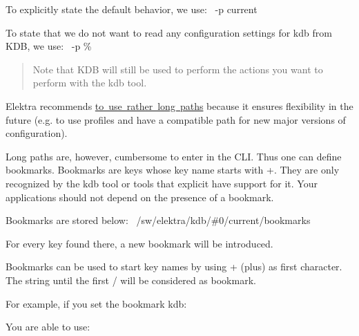 To explicitly state the default behavior, we use\+:~\newline
 {\ttfamily -\/p current}

To state that we do not want to read any configuration settings for {\ttfamily kdb} from K\+DB, we use\+:~\newline
 {\ttfamily -\/p \%}

\begin{quote}
Note that K\+DB will still be used to perform the actions you want to perform with the {\ttfamily kdb} tool. \end{quote}


Elektra recommends \mbox{\hyperlink{doc_tutorials_application-integration_md}{to use rather long paths}} because it ensures flexibility in the future (e.\+g. to use profiles and have a compatible path for new major versions of configuration).

Long paths are, however, cumbersome to enter in the C\+LI. Thus one can define bookmarks. Bookmarks are keys whose key name starts with {\ttfamily +}. They are only recognized by the {\ttfamily kdb} tool or tools that explicit have support for it. Your applications should not depend on the presence of a bookmark.

Bookmarks are stored below\+:~\newline
 {\ttfamily /sw/elektra/kdb/\#0/current/bookmarks}

For every key found there, a new bookmark will be introduced.

Bookmarks can be used to start key names by using {\ttfamily +} (plus) as first character. The string until the first {\ttfamily /} will be considered as bookmark.

For example, if you set the bookmark kdb\+:


\begin{DoxyCode}{0}
\end{DoxyCode}


You are able to use\+:


\begin{DoxyCode}{0}
\end{DoxyCode}



